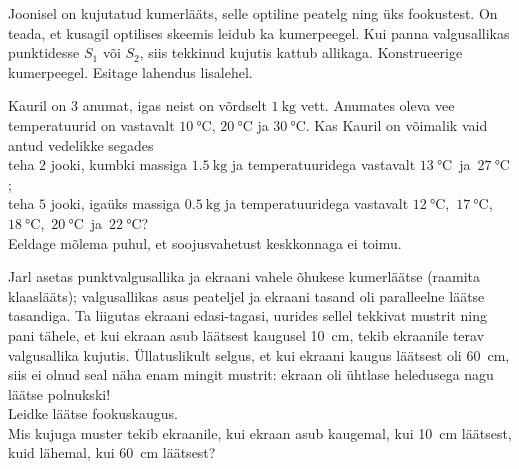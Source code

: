\documentclass[10pt]{article}
\begin{document}

Joonisel on kujutatud kumerlääts, selle optiline peatelg ning üks fookustest. On teada, et kusagil optilises skeemis leidub ka kumerpeegel. Kui panna valgusallikas punktidesse $S_1$ või $S_2$, siis tekkinud kujutis kattub allikaga. Konstrueerige kumerpeegel. Esitage lahendus lisalehel.
\begin{figure}[h]
  \vspace{-1em}
  \centering
  \vspace{-1em}
\end{figure}
\probend
\bigskip


Kauril on 3 anumat, igas neist on võrdselt $\SI{1}{\kilo\gram}$ vett. Anumates oleva vee temperatuurid on vastavalt $\SI{10}{\celsius}$, $\SI{20}{\celsius}$ ja $\SI{30}{\celsius}$.
Kas Kauril on võimalik vaid antud vedelikke segades \\
\osa teha $2$ jooki, kumbki massiga $\SI{1.5}{\kilo\gram}$ ja temperatuuridega vastavalt $\SI{13}{\celsius}$~ja~$\SI{27}{\celsius}$;\\
\osa teha $5$ jooki, igaüks massiga $\SI{0.5}{\kilo\gram}$ ja temperatuuridega vastavalt $\SI{12}{\celsius}$,~$\SI{17}{\celsius}$,~$\SI{18}{\celsius}$,~$\SI{20}{\celsius}$~ja~$\SI{22}{\celsius}$?\\
Eeldage mõlema puhul, et soojusvahetust keskkonnaga ei toimu.
\probend
\bigskip


Jarl asetas punktvalgusallika ja ekraani vahele õhukese kumerläätse (raamita klaaslääts); valgusallikas asus peateljel ja ekraani tasand oli paralleelne läätse tasandiga. Ta liigutas ekraani edasi-tagasi, uurides sellel tekkivat mustrit ning pani tähele, et kui ekraan asub läätsest kaugusel \SI{10}{\cm}, tekib ekraanile terav valgusallika kujutis. Üllatuslikult selgus, et kui ekraani kaugus läätsest oli \SI{60}{\cm}, siis ei olnud seal näha enam mingit mustrit: ekraan oli ühtlase heledusega nagu läätse polnukski!\\
\osa Leidke läätse fookuskaugus.\\
\osa Mis kujuga muster tekib ekraanile, kui ekraan asub kaugemal, kui \SI{10}{\cm} läätsest, kuid lähemal, kui \SI{60}{\cm} läätsest?
\probend
\bigskip
\end{document}
